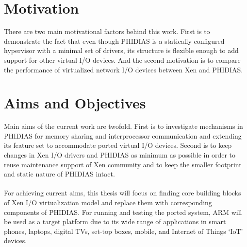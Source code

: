 \section{Motivation\label{sec:moti}}
There are two main motivational factors behind this work. First is to demonstrate the fact that even though PHIDIAS is a statically configured hypervisor with a minimal set of drivers, its structure is flexible enough to add support for other virtual I/O devices. And the second motivation is to compare the performance of virtualized network I/O devices between Xen and PHIDIAS.

\section{Aims and Objectives\label{sec:objective}}
Main aims of the current work are twofold. First is to investigate mechanisms in PHIDIAS for memory sharing and interprocessor communication and extending its feature set to accommodate ported virtual I/O devices. Second is to keep changes in Xen I/O drivers and PHIDIAS as minimum as possible in order to reuse maintenance support of Xen community and to keep the smaller footprint and static nature of PHIDIAS intact.
\\
\\
For achieving current aims, this thesis will focus on finding core building blocks of Xen I/O virtualization model and replace them with corresponding components of PHIDIAS. For running and testing the ported system, ARM will be used as a target platform due to its wide range of applications in smart phones, laptops, digital TVs, set-top boxes, mobile, and Internet of Things `IoT' devices. 


